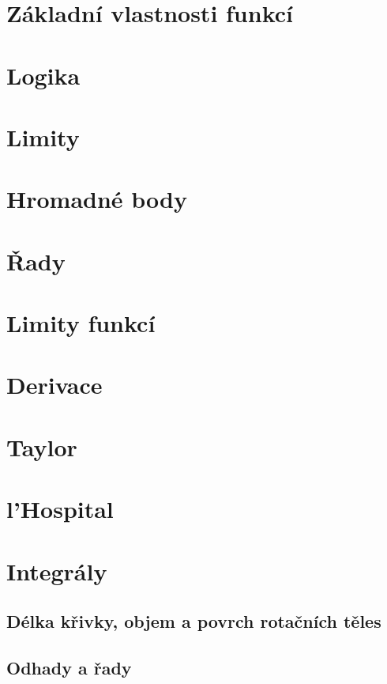 \documentclass[a4paper,10pt]{book}
\begin{document}
	\section{Základní vlastnosti funkcí}
	\section{Logika}
		
	\section{Limity}
		
		
	\section{Hromadné body}
	  
	\section{Řady}
	  
	\section{Limity funkcí}
	  
	  
	  
	  
	\section{Derivace}
	  
	  
	\section{Taylor} \label{sec:taylor}
	  
	\section{l'Hospital}
	  
	\section{Integrály}
	  
	\subsection{Délka křivky, objem a povrch rotačních těles}
	  
	\subsection{Odhady a řady}
	  
\end{document}
